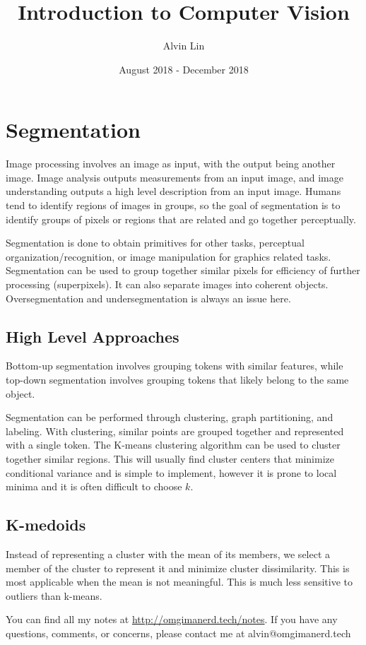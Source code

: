 \documentclass{math}
\title{Introduction to Computer Vision}
\author{Alvin Lin}
\date{August 2018 - December 2018}
\begin{document}
\maketitle

\section*{Segmentation}
Image processing involves an image as input, with the output being another
image. Image analysis outputs measurements from an input image, and image
understanding outputs a high level description from an input image. Humans
tend to identify regions of images in groups, so the goal of segmentation is to
identify groups of pixels or regions that are related and go together
perceptually. \par
Segmentation is done to obtain primitives for other tasks, perceptual
organization/recognition, or image manipulation for graphics related tasks.
Segmentation can be used to group together similar pixels for efficiency of
further processing (superpixels). It can also separate images into coherent
objects. Oversegmentation and undersegmentation is always an issue here.

\subsection*{High Level Approaches}
Bottom-up segmentation involves grouping tokens with similar features, while
top-down segmentation involves grouping tokens that likely belong to the same
object. \par
Segmentation can be performed through clustering, graph partitioning, and
labeling. With clustering, similar points are grouped together and represented
with a single token. The K-means clustering algorithm can be used to cluster
together similar regions. This will usually find cluster centers that
minimize conditional variance and is simple to implement, however it is prone
to local minima and it is often difficult to choose \( k \).

\subsection*{K-medoids}
Instead of representing a cluster with the mean of its members, we select a
member of the cluster to represent it and minimize cluster dissimilarity. This
is most applicable when the mean is not meaningful. This is much less sensitive
to outliers than k-means.

\begin{center}
  You can find all my notes at \url{http://omgimanerd.tech/notes}. If you have
  any questions, comments, or concerns, please contact me at
  alvin@omgimanerd.tech
\end{center}
\end{document}

